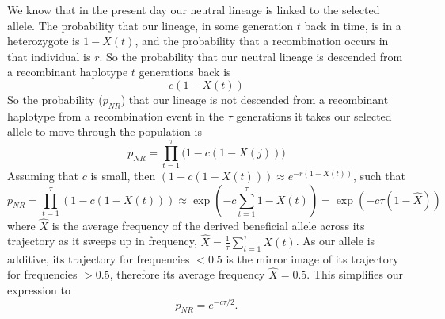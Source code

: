 We know that in the present day our neutral lineage is linked to
the selected allele. The probability that our lineage, in some
generation $t$ back in time, is in a heterozygote is $1-X(t)$, and the
probability that a recombination occurs in that individual is $r$. So
the probability that our neutral lineage is descended from a
recombinant haplotype $t$ generations back is 
\begin{equation}
c (1-X(t))
\end{equation}
So the probability ($p_{NR}$) that our lineage is not descended from a
recombinant haplotype 
from a recombination event in the
$\tau$ generations it takes our selected allele to move through the
population is
\begin{equation}
p_{NR}=\prod_{t=1}^{\tau} \big(1- c(1-X(j))\big)
\end{equation}
Assuming that $c$ is small, then $ \left(1- c(1-X(t))\right) \approx
e^{-r(1-X(t))}$,  such that
\begin{equation}
p_{NR}=\prod_{t=1}^{\tau} \left(1- c(1-X(t))\right) \approx \exp
\left( -c\sum_{t=1}^{\tau}
1- X(t) \right) =\exp
\left( -c \tau (1-\widehat{X}) \right)
\end{equation}
where
$\widehat{X}$ is the average frequency of the derived beneficial allele across its trajectory as it sweeps up in frequency,
$\widehat{X} = \frac{1}{\tau}  \sum_{t=1}^{\tau}
 X(t)$. As our allele is additive, its trajectory for frequencies
 $<0.5$ is the mirror image of its trajectory for frequencies $>0.5$, therefore its
average frequency $\widehat{X} =0.5$. This simplifies our expression to
\begin{equation}
p_{NR} = e^{-c \tau/2 }.
\end{equation}



